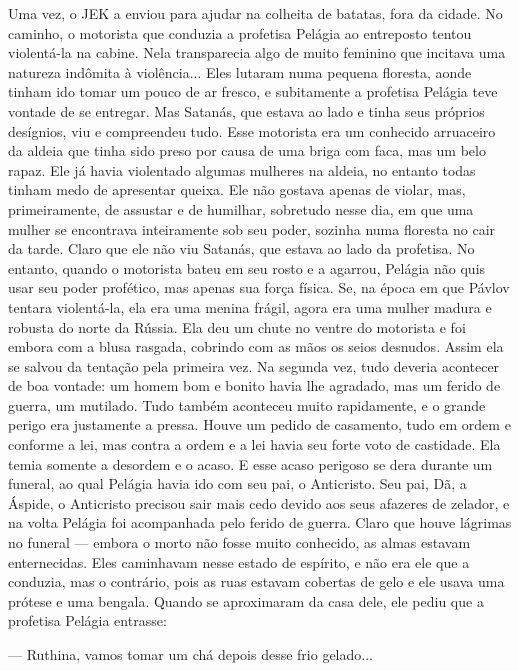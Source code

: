 Uma vez, o JEK a enviou para ajudar na colheita de batatas, fora da
cidade. No caminho, o motorista que conduzia a profetisa Pelágia ao
entreposto tentou violentá-la na cabine. Nela transparecia algo de muito
feminino que incitava uma natureza indômita à violência... Eles lutaram
numa pequena floresta, aonde tinham ido tomar um pouco de ar fresco, e
subitamente a profetisa Pelágia teve vontade de se entregar. Mas
Satanás, que estava ao lado e tinha seus próprios desígnios, viu e
compreendeu tudo. Esse motorista era um conhecido arruaceiro da aldeia
que tinha sido preso por causa de uma briga com faca, mas um belo rapaz.
Ele já havia violentado algumas mulheres na aldeia, no entanto todas
tinham medo de apresentar queixa. Ele não gostava apenas de violar, mas,
primeiramente, de assustar e de humilhar, sobretudo nesse dia, em que
uma mulher se encontrava inteiramente sob seu poder, sozinha numa
floresta no cair da tarde. Claro que ele não viu Satanás, que estava ao
lado da profetisa. No entanto, quando o motorista bateu em seu rosto e a
agarrou, Pelágia não quis usar seu poder profético, mas apenas sua força
física. Se, na época em que Pávlov tentara violentá-la, ela era uma
menina frágil, agora era uma mulher madura e robusta do norte da Rússia.
Ela deu um chute no ventre do motorista e foi embora com a blusa
rasgada, cobrindo com as mãos os seios desnudos. Assim ela se salvou da
tentação pela primeira vez. Na segunda vez, tudo deveria acontecer de
boa vontade: um homem bom e bonito havia lhe agradado, mas um ferido de
guerra, um mutilado. Tudo também aconteceu muito rapidamente, e o grande
perigo era justamente a pressa. Houve um pedido de casamento, tudo em
ordem e conforme a lei, mas contra a ordem e a lei havia seu forte voto
de castidade. Ela temia somente a desordem e o acaso. E esse acaso
perigoso se dera durante um funeral, ao qual Pelágia havia ido com seu
pai, o Anticristo. Seu pai, Dã, a Áspide, o Anticristo precisou sair
mais cedo devido aos seus afazeres de zelador, e na volta Pelágia foi
acompanhada pelo ferido de guerra. Claro que houve lágrimas no funeral
--- embora o morto não fosse muito conhecido, as almas estavam
enternecidas. Eles caminhavam nesse estado de espírito, e não era ele
que a conduzia, mas o contrário, pois as ruas estavam cobertas de gelo e
ele usava uma prótese e uma bengala. Quando se aproximaram da casa dele,
ele pediu que a profetisa Pelágia entrasse:

--- Ruthina, vamos tomar um chá depois desse frio gelado...

